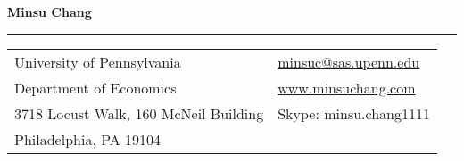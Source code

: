 \documentclass[letterpaper,11pt,oneside]{article}
\newcommand*{\Skype}{\href{skype:minsu.chang1111?add}{minsu.chang1111}}
\newcommand{\Absender}[1][\normalsize]{\Skype}
\begin{document}

\noindent  \LARGE{\textbf{Minsu Chang}}  \\
\vspace{-1ex}
\hrule
\normalsize


\begin{center}
\begin{tabular}{l l}
 University of Pennsylvania    & \hspace{1in} \href{mailto:minsuc@sas.upenn.edu}{minsuc@sas.upenn.edu} \\
 Department of Economics    & \hspace{1in}  \href{www.minsuchang.com}{www.minsuchang.com}   \\
 3718 Locust Walk, 160 McNeil Building             & \hspace{1in} Skype: minsu.chang1111 \\%
 Philadelphia, PA 19104 &\\%
\end{tabular}
\end{center}

\vspace{1em}

\end{document}
